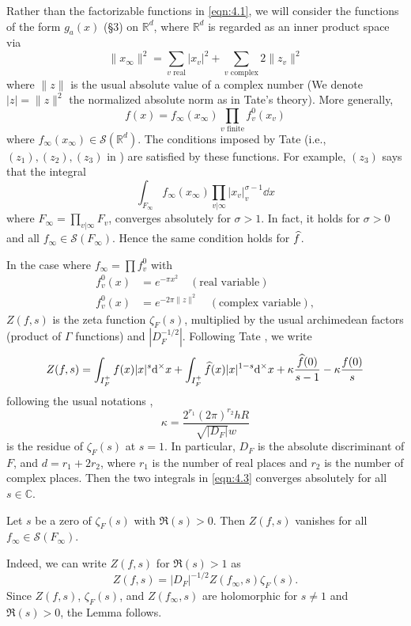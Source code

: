 Rather than the factorizable functions in \eqref{eqn:4.1}, we will consider the functions of the form $g_{a}(x)$ (\S 3) on $\mathbb{R}^{d}$, where $\mathbb{R}^{d}$ is regarded as an inner product space via
\[
    \|x_\infty\|^{2} = \sum_{v \text{ real}} |x_v|^{2} + \sum_{v \text{ complex}} 2 \|z_{v}\|^{2}
\]
where $\|z\|$ is the usual absolute value of a complex number (We denote $|z| = \|z\|^{2}$ the normalized absolute norm as in Tate's theory).
More generally,
\begin{equation}
    \label{eqn:4.2}
    f(x) = f_\infty(x_\infty) \prod_{v\text{ finite}} f_v^0(x_v)
\end{equation}
where $f_\infty(x_\infty) \in \mathcal{S}(\mathbb{R}^{d})$.
The conditions imposed by Tate (i.e., $(z_1), (z_2), (z_3)$ in \cite[\S 4.4]{tate1967fourier}) are satisfied by these functions.
For example, $(z_3)$ says that the integral
\[
    \int_{F_\infty} f_\infty(x_\infty) \prod_{v|\infty} |x_v|_v^{\sigma - 1} \dd x
\]
where $F_\infty = \prod_{v|\infty}F_v$, converges absolutely for $\sigma > 1$.
In fact, it holds for $\sigma > 0$ and all $f_\infty \in \mathcal{S}(F_\infty)$.
Hence the same condition holds for $\widehat{f}$.

In the case where $f_\infty = \prod f_v^0$ with
\begin{align*}
    f_v^0(x) &= e^{-\pi x^2} \quad (\text{real variable}) \\
    f_v^0(x) &= e^{-2 \pi \|z\|^{2}} \quad (\text{complex variable}),
\end{align*}
$Z(f, s)$ is the zeta function $\zeta_F(s)$, multiplied by the usual archimedean factors (product of $\Gamma$ functions) and $|D_F^{-1/2}|$.
Following Tate \cite{tate1967fourier}, we write
\begin{equation}
    \label{eqn:4.3}
    Z(f, s) = \int_{I_F^{+}} f(x) |x|^{s} \mathrm{d}^\times x + \int_{I_F^{+}} \widehat{f}(x)|x|^{1-s} \mathrm{d}^\times x + \kappa \frac{\widehat{f}(0)}{s - 1} - \kappa \frac{f(0)}{s}
\end{equation}
following the usual notations \cite[Th\'eor\`eme 4.3.2]{tate1967fourier},
\[
    \kappa = \frac{2^{r_1}(2 \pi)^{r_2} h R}{\sqrt{|D_F|}w}
\]
is the residue of $\zeta_F(s)$ at $s = 1$.
In particular, $D_F$ is the absolute discriminant of $F$, and $d = r_1 + 2 r_2$, where $r_1$ is the number of real places and $r_2$ is the number of complex places.
Then the two integrals in \eqref{eqn:4.3} converges absolutely for all $s \in \mathbb{C}$.


\begin{lemma}
\label{lem:4.1}
Let $s$ be a zero of $\zeta_F(s)$ with $\Re(s) > 0$.
Then $Z(f, s)$ vanishes for all $f_\infty \in \mathcal{S}(F_\infty)$.
\end{lemma}
Indeed, we can write $Z(f, s)$ for $\Re(s) > 1$ as
\[
    Z(f, s) = |D_F|^{-1/2} Z(f_\infty, s) \zeta_F(s).
\]
Since $Z(f, s)$, $\zeta_F(s)$, and $Z(f_\infty, s)$ are holomorphic for $s \neq 1$ and $\Re (s) > 0$, the Lemma follows.

